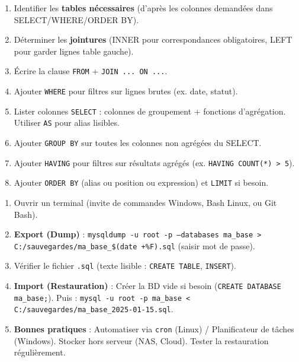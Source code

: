 \documentclass[11pt]{article}
\begin{document}
\begin{bilan}
\begin{methode}
\begin{enumerate}
\item Identifier les \textbf{tables nécessaires} (d'après les colonnes demandées dans SELECT/WHERE/ORDER BY).
\item Déterminer les \textbf{jointures} (INNER pour correspondances obligatoires, LEFT pour garder lignes table gauche).
\item Écrire la clause \texttt{FROM} + \texttt{JOIN ... ON ...}.
\item Ajouter \texttt{WHERE} pour filtres sur lignes brutes (ex. date, statut).
\item Lister colonnes \texttt{SELECT} : colonnes de groupement + fonctions d'agrégation. Utiliser \texttt{AS} pour alias lisibles.
\item Ajouter \texttt{GROUP BY} sur toutes les colonnes non agrégées du SELECT.
\item Ajouter \texttt{HAVING} pour filtres sur résultats agrégés (ex. \texttt{HAVING COUNT(*) > 5}).
\item Ajouter \texttt{ORDER BY} (alias ou position ou expression) et \texttt{LIMIT} si besoin.
\end{enumerate}
\end{methode}

\begin{methode}
\begin{enumerate}
\item Ouvrir un terminal (invite de commandes Windows, Bash Linux, ou Git Bash).
\item \textbf{Export (Dump)} : \texttt{mysqldump -u root -p --databases ma\_base > C:/sauvegardes/ma\_base\_\$(date +\%F).sql} (saisir mot de passe).
\item Vérifier le fichier \texttt{.sql} (texte lisible : \texttt{CREATE TABLE}, \texttt{INSERT}).
\item \textbf{Import (Restauration)} : Créer la BD vide si besoin (\texttt{CREATE DATABASE ma\_base;}). Puis : \texttt{mysql -u root -p ma\_base < C:/sauvegardes/ma\_base\_2025-01-15.sql}.
\item \textbf{Bonnes pratiques} : Automatiser via \texttt{cron} (Linux) / Planificateur de tâches (Windows). Stocker hors serveur (NAS, Cloud). Tester la restauration régulièrement.
\end{enumerate}
\end{methode}

\end{bilan}
\end{document}
